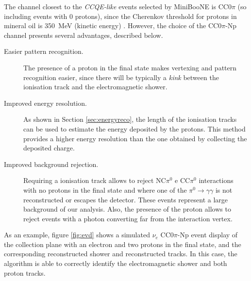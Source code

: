 The channel closest to the \emph{CCQE-like} events selected by MiniBooNE is CC0$\pi$ (so including events with 0 protons), since the Cherenkov threshold for protons in mineral oil is 350~MeV (kinetic energy) \cite{Perevalov:2009mn}.
However, the choice of the CC0$\pi$-Np channel presents several advantages, described below.
\begin{description}
    \item[Easier pattern recognition.] The presence of a proton in the final state makes vertexing and pattern recognition easier, since there will be typically a \emph{kink} between the ionisation track and the electromagnetic shower.
    \item[Improved energy resolution.] As shown in Section \ref{sec:energyreco}, the length of the ionisation tracks can be used to estimate the energy deposited by the protons. This method provides a higher energy resolution than the one obtained by collecting the deposited charge.
    \item[Improved background rejection.] Requiring a ionisation track allows to reject NC$\pi^0$ e CC$\pi^0$ interactions with no protons in the final state and where one of the $\pi^0\rightarrow\gamma\gamma$ is not reconstructed or escapes the detector. These events represent a large background of our analysis. Also, the presence of the proton allows to reject events with a photon converting far from the interaction vertex.
\end{description}


As an example, figure \ref{fig:evd} shows a simulated $\nu_{e}$ CC0$\pi$-Np event display of the collection plane with an electron and two protons in the final state, and the corresponding reconstructed shower and reconstructed tracks. In this case, the algorithm is able to correctly identify the electromagnetic shower and both proton tracks.

